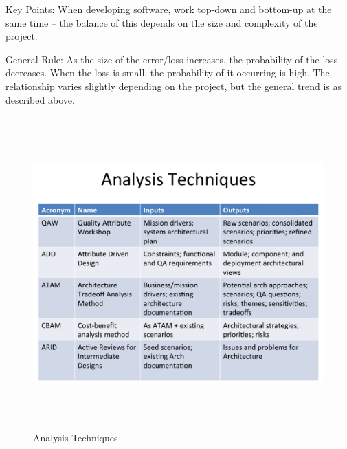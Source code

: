 \documentclass[a4paper]{report}
\begin{document}
Key Points:
When developing software, work top-down and bottom-up at the same time – the balance of this depends on the size and complexity of the project.

General Rule:
As the size of the error/loss increases, the probability of the loss decreases. When the loss is small, the probability of it occurring is high. The relationship varies slightly depending on the project, but the general trend is as described above.

\begin{figure}[h]
\begin{center} 
    \includegraphics[scale=0.8,width = 15cm, height = 12cm]{images/Analysis1.pdf}
    \caption{Analysis Techniques}
\end{center}
\end{figure}
\end{document}
